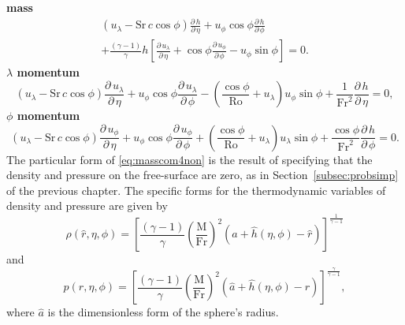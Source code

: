 {\bfseries mass}
\begin{multline}
\left(u_{\scriptscriptstyle \lambda}-\mathrm{Sr}\,c\cos\phi\right)\frac{\partial \, h}{\partial \, \eta} + u_{\scriptscriptstyle \phi}\cos\phi\frac{\partial \, h}{\partial \, \phi} \\ +\frac{(\gamma-1)}{\gamma}h\left[\frac{\partial \, u_{\scriptscriptstyle \lambda}}{\partial \, \eta}+\cos\phi\frac{\partial \, u_{\scriptscriptstyle \phi}}{\partial \, \phi}-u_{\scriptscriptstyle \phi}\sin\phi\right]=0. \label{eq:masscom4non}
\end{multline}
{\bfseries \boldmath$\lambda$ momentum}
\begin{equation}
\left(u_{\scriptscriptstyle \lambda}-\mathrm{Sr}\,c\cos\phi\right)\frac{\partial \, u_{\scriptscriptstyle \lambda}}{\partial \, \eta} + u_{\scriptscriptstyle \phi}\cos\phi\frac{\partial \, u_{\scriptscriptstyle \lambda}}{\partial \, \phi} - \left(\frac{\cos\phi}{\mathrm{Ro}} + u_{\scriptscriptstyle \lambda}\right)u_{\scriptscriptstyle \phi}\sin\phi + \frac{1}{\mathrm{Fr}^2}\frac{\partial \, h}{\partial \, \eta} = 0, \label{eq:lamcom4nonlin}
\end{equation}
{\bfseries \boldmath$\phi$ momentum}
\begin{equation}
\left(u_{\scriptscriptstyle \lambda}-\mathrm{Sr}\,c\cos\phi\right)\frac{\partial \, u_{\scriptscriptstyle \phi}}{\partial \, \eta} + u_{\scriptscriptstyle \phi}\cos\phi\frac{\partial \, u_{\scriptscriptstyle \phi}}{\partial \, \phi} + \left(\frac{\cos\phi}{\mathrm{Ro}} + u_{\scriptscriptstyle \lambda} \right)u_{\scriptscriptstyle \lambda}\sin\phi + \frac{\cos\phi}{\mathrm{Fr}^2}\frac{\partial \, h}{\partial \, \phi} = 0. \label{eq:phicom4nonlin}
\end{equation}
The particular form of \eqref{eq:masscom4non} is the result of specifying that the density and pressure on the free-surface are zero, as in Section~\ref{subsec:probsimp} of the previous chapter. The specific forms for the thermodynamic variables of density and pressure are given by
\begin{equation}
\rho(\hat{r},\eta,\phi) =\left[\frac{(\gamma-1)}{\gamma}\left( \frac{\mbox{M}}{\mbox{Fr}}\right)^2 \left(\hat{a}+\hat{h}(\eta,\phi)-\hat{r}\right) \right]^{\frac{1}{\gamma-1}} \label{eq:dencompnon4}
\end{equation}
and
\begin{equation}
p(\hat{r},\eta,\phi) =\left[\frac{(\gamma-1)}{\gamma}\left( \frac{\mbox{M}}{\mbox{Fr}}\right)^2 \left(\hat{a}+\hat{h}(\eta,\phi)-\hat{r}\right) \right]^{\frac{\gamma}{\gamma-1}}, \label{eq:pcompnon4}
\end{equation}
where $\hat{a}$ is the dimensionless form of the sphere's radius.

